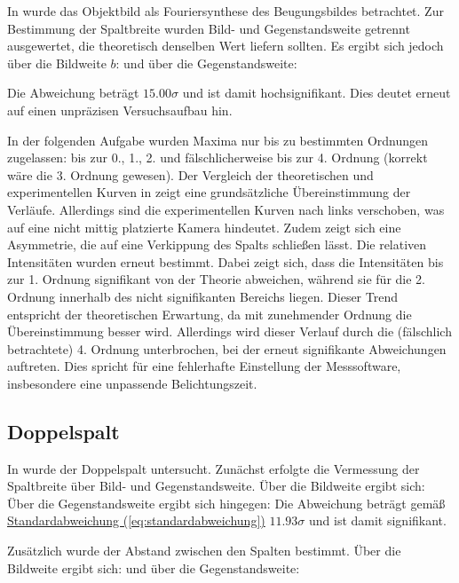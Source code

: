 In  wurde das Objektbild als Fouriersynthese des Beugungsbildes betrachtet. Zur Bestimmung der Spaltbreite wurden Bild- und Gegenstandsweite getrennt ausgewertet, die theoretisch denselben Wert liefern sollten. Es ergibt sich jedoch über die Bildweite $b$:
und über die Gegenstandsweite:

Die Abweichung beträgt $15.00\sigma$ und ist damit hochsignifikant. Dies deutet erneut auf einen unpräzisen Versuchsaufbau hin.

In der folgenden Aufgabe wurden Maxima nur bis zu bestimmten Ordnungen zugelassen: bis zur 0., 1., 2. und fälschlicherweise bis zur 4. Ordnung (korrekt wäre die 3. Ordnung gewesen).
Der Vergleich der theoretischen und experimentellen Kurven in  zeigt eine grundsätzliche Übereinstimmung der Verläufe. Allerdings sind die experimentellen Kurven nach links verschoben, was auf eine nicht mittig platzierte Kamera hindeutet. Zudem zeigt sich eine Asymmetrie, die auf eine Verkippung des Spalts schließen lässt.
Die relativen Intensitäten wurden erneut bestimmt. Dabei zeigt sich, dass die Intensitäten bis zur 1. Ordnung signifikant von der Theorie abweichen, während sie für die 2. Ordnung innerhalb des nicht signifikanten Bereichs liegen. Dieser Trend entspricht der theoretischen Erwartung, da mit zunehmender Ordnung die Übereinstimmung besser wird. Allerdings wird dieser Verlauf durch die (fälschlich betrachtete) 4. Ordnung unterbrochen, bei der erneut signifikante Abweichungen auftreten. Dies spricht für eine fehlerhafte Einstellung der Messsoftware, insbesondere eine unpassende Belichtungszeit.

\subsection*{Doppelspalt}

In  wurde der Doppelspalt untersucht. Zunächst erfolgte die Vermessung der Spaltbreite über Bild- und Gegenstandsweite. Über die Bildweite ergibt sich:
Über die Gegenstandsweite ergibt sich hingegen:
Die Abweichung beträgt gemäß \hyperref[eq:standardabweichung]{Standardabweichung (\ref*{eq:standardabweichung})} $11.93\sigma$ und ist damit signifikant.

Zusätzlich wurde der Abstand zwischen den Spalten bestimmt. Über die Bildweite ergibt sich:
und über die Gegenstandsweite:

